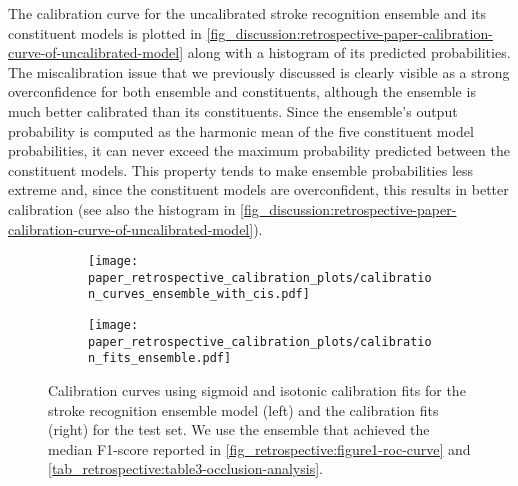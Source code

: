 The calibration curve for the uncalibrated stroke recognition ensemble and its constituent models is plotted in \cref{fig_discussion:retrospective-paper-calibration-curve-of-uncalibrated-model} along with a histogram of its predicted probabilities. The miscalibration issue that we previously discussed is clearly visible as a strong overconfidence for both ensemble and constituents, although the ensemble is much better calibrated than its constituents. Since the ensemble's output probability is computed as the harmonic mean of the five constituent model probabilities, it can never exceed the maximum probability predicted between the constituent models. This property tends to make ensemble probabilities less extreme and, since the constituent models are overconfident, this results in better calibration (see also the histogram in \cref{fig_discussion:retrospective-paper-calibration-curve-of-uncalibrated-model}). 

\begin{figure}
    \centering
    \begin{subfigure}[c]{0.49\columnwidth}
        \centering
        \texttt{[image: paper\_retrospective\_calibration\_plots/calibration\_curves\_ensemble\_with\_cis.pdf]}
    \end{subfigure}
    \hfill
    \begin{subfigure}[c]{0.49\columnwidth}
        \centering
        \texttt{[image: paper\_retrospective\_calibration\_plots/calibration\_fits\_ensemble.pdf]}
    \end{subfigure}    
    \caption[Calibration fits and curves for the stroke recognition ensemble using Platt-scaling and isotonic regression for calibration.]{ Calibration curves using sigmoid and isotonic calibration fits for the stroke recognition ensemble model (left) and the calibration fits (right) for the test set. We use the ensemble that achieved the median F1-score reported in \cref{fig_retrospective:figure1-roc-curve} and \cref{tab_retrospective:table3-occlusion-analysis}.}
    \label{fig_discussion:retrospective-paper-calibration-curve-sigmoid-isotonic}
\end{figure}

